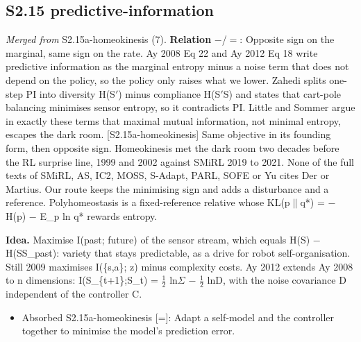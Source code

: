 \documentclass[10pt]{article}
\begin{document}
\subsection{S2.15 predictive-information}\label{node:S2-S2-15-predictive-information}
\textit{Merged from} S2.15a-homeokinesis (7). \textbf{Relation} $-$/$=$: Opposite sign on the marginal, same sign on the rate. Ay 2008 Eq 22 and Ay 2012 Eq 18 write predictive information as the marginal entropy minus a noise term that does not depend on the policy, so the policy only raises what we lower. Zahedi splits one-step PI into diversity H(S\ensuremath{'}) minus compliance H(S\ensuremath{'}\textbar{}S) and states that cart-pole balancing minimises sensor entropy, so it contradicts PI. Little and Sommer argue in exactly these terms that maximal mutual information, not minimal entropy, escapes the dark room. [S2.15a-homeokinesis] Same objective in its founding form, then opposite sign. Homeokinesis met the dark room two decades before the RL surprise line, 1999 and 2002 against SMiRL 2019 to 2021. None of the full texts of SMiRL, AS, IC2, MOSS, S-Adapt, PARL, SOFE or Yu cites Der or Martius. Our route keeps the minimising sign and adds a disturbance and a reference. Polyhomeostasis is a fixed-reference relative whose KL(p\ensuremath{\|}q*) = \ensuremath{-}H(p) \ensuremath{-} E\_p ln q* rewards entropy.

\textbf{Idea.} Maximise I(past; future) of the sensor stream, which equals H(S) \ensuremath{-} H(S\textbar{}S\_past): variety that stays predictable, as a drive for robot self-organisation. Still 2009 maximises I(\{s,a\}; z) minus complexity costs. Ay 2012 extends Ay 2008 to n dimensions: I(S\_\{t+1\};S\_t) = \ensuremath{\tfrac12} ln\textbar{}\ensuremath{\Sigma}\textbar{} \ensuremath{-} \ensuremath{\tfrac12} ln\textbar{}D\textbar{}, with the noise covariance D independent of the controller C.
\begin{itemize}[nosep,leftmargin=1.2em]
\item Absorbed S2.15a-homeokinesis [=]: Adapt a self-model and the controller together to minimise the model's prediction error.
\end{itemize}
\end{document}
